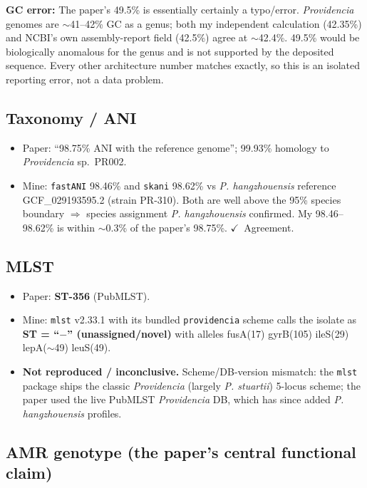 \documentclass[11pt]{article}
\begin{document}
\textbf{GC error:} The paper's 49.5\% is essentially certainly a typo/error.
\textit{Providencia} genomes are $\sim$41--42\% GC as a genus; both my independent
calculation (42.35\%) and NCBI's own assembly-report field (42.5\%) agree at $\sim$42.4\%.
49.5\% would be biologically anomalous for the genus and is not supported by the deposited
sequence. Every other architecture number matches exactly, so this is an isolated reporting
error, not a data problem.

\subsection{Taxonomy / ANI}
\begin{itemize}
  \item Paper: ``98.75\% ANI with the reference genome''; 99.93\% homology to \textit{Providencia} sp.\ PR002.
  \item Mine: \texttt{fastANI} 98.46\% and \texttt{skani} 98.62\% vs \textit{P. hangzhouensis} reference
        GCF\_029193595.2 (strain PR-310). Both are well above the 95\% species boundary $\Rightarrow$
        species assignment \textit{P. hangzhouensis} confirmed. My 98.46--98.62\% is within $\sim$0.3\%
        of the paper's 98.75\%. $\checkmark$~Agreement.
\end{itemize}

\subsection{MLST}
\begin{itemize}
  \item Paper: \textbf{ST-356} (PubMLST).
  \item Mine: \texttt{mlst} v2.33.1 with its bundled \texttt{providencia} scheme calls the isolate as
        \textbf{ST = ``$-$'' (unassigned/novel)} with alleles fusA(17) gyrB(105) ileS(29) lepA($\sim$49) leuS(49).
  \item \textbf{Not reproduced / inconclusive.} Scheme/DB-version mismatch: the \texttt{mlst} package ships
        the classic \textit{Providencia} (largely \textit{P. stuartii}) 5-locus scheme; the paper used the
        live PubMLST \textit{Providencia} DB, which has since added \textit{P. hangzhouensis} profiles.
\end{itemize}

\subsection{AMR genotype (the paper's central functional claim)}
\end{document}

